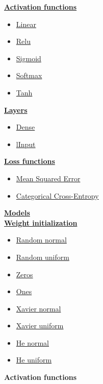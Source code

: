 \documentclass{article}
\begin{document}
    \hyperlink{activation_functions}{\textbf{Activation functions}}
    \begin{itemize}
        \item \hyperlink{linear}{Linear}
        \item \hyperlink{relu}{Relu}
        \item \hyperlink{sigmoid}{Sigmoid}
        \item \hyperlink{softmax}{Softmax}
        \item \hyperlink{tanh}{Tanh}
    \end{itemize}

    \hyperlink{layers}{\textbf{Layers}}
    \begin{itemize}
        \item \hyperlink{dense_layer}{Dense}
        \item \hyperlink{input_layer}{lInput}
    \end{itemize}
    \hyperlink{losses}{\textbf{Loss functions}}
    \begin{itemize}
        \item \hyperlink{mse}{Mean Squared Error}
        \item \hyperlink{cce}{Categorical Cross-Entropy}
    \end{itemize}
    \hyperlink{models}{\textbf{Models}} \\

    \hyperlink{weight_initialization}{\textbf{Weight initialization}}
        \begin{itemize}
        \item \hyperlink{initialization_random_normal}{Random normal}
        \item \hyperlink{initialization_random_uniform}{Random uniform}
        \item \hyperlink{initialization_zeros}{Zeros}
        \item \hyperlink{initialization_ones}{Ones}
        \item \hyperlink{initialization_xavier_normal}{Xavier normal}
        \item \hyperlink{initialization_xavier_uniform}{Xavier uniform}
        \item \hyperlink{initialization_he_normal}{He normal}
        \item \hyperlink{initialization_he_uniform}{He uniform}
    \end{itemize}
    \clearpage

    \hypertarget{activation_functions}{\textbf{Activation functions}} \\
\end{document}
